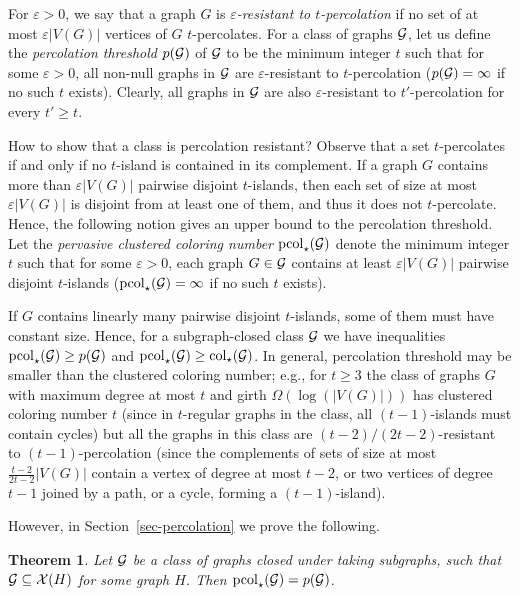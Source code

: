 \documentclass[12pt]{article}
\newcommand{\GG}{{\cal G}}
\newtheorem{theorem}{Theorem}
\newcommand{\col}{\text{col}}
\newcommand{\mc}[1]{\mathcal{#1}}
\begin{document}
For $\varepsilon>0$, we say that a graph $G$ is \emph{$\varepsilon$-resistant to $t$-percolation} if no set of at most $\varepsilon|V(G)|$ vertices of $G$ $t$-percolates.
For a class of graphs $\GG$, let us define the \emph{percolation threshold $p(\GG)$}
of $\GG$ to be the minimum integer $t$ such that for some $\varepsilon>0$, all non-null graphs in $\GG$
are $\varepsilon$-resistant to $t$-percolation ($p(\GG)=\infty$ if no such $t$ exists).  Clearly, all graphs in $\GG$ are also $\varepsilon$-resistant to $t'$-percolation for every $t'\ge t$.

How to show that a class is percolation resistant?  Observe that a set $t$-percolates if and only if no $t$-island is contained in its complement.  If a graph $G$ contains more than $\varepsilon |V(G)|$
pairwise disjoint $t$-islands, then each set of size at most $\varepsilon|V(G)|$ is disjoint from at least one of them, and thus it does not $t$-percolate.  Hence, the following notion gives an upper bound to
the percolation threshold.  Let the \emph{pervasive clustered coloring number $\text{pcol}_\star(\GG)$} denote the minimum integer $t$ such that for some $\varepsilon>0$, each graph $G\in\GG$ contains at least $\varepsilon |V(G)|$ pairwise disjoint $t$-islands
($\text{pcol}_\star(\GG)=\infty$ if no such $t$ exists).

If $G$ contains linearly many pairwise disjoint $t$-islands, some of them must have constant size.  Hence, for a subgraph-closed class $\GG$ we have inequalities $\text{pcol}_\star(\GG)\ge p(\GG)$ and $\text{pcol}_\star(\GG)\ge \col_\star(\GG)$.
In general, percolation threshold may be smaller than the clustered coloring number; e.g., for $t\ge 3$ the class of graphs $G$ with maximum degree at most $t$ and girth $\Omega(\log(|V(G)|))$
has clustered coloring number $t$ (since in $t$-regular graphs in the class, all $(t-1)$-islands must contain cycles) but all the graphs in this class are $(t-2)/(2t-2)$-resistant to $(t-1)$-percolation
(since the complements of sets of size at most $\tfrac{t-2}{2t-2}|V(G)|$ contain a vertex of degree at most $t-2$, or two vertices of degree $t-1$ joined by a path, or a cycle, forming a $(t-1)$-island).

However, in Section~\ref{sec-percolation} we prove the following.
 
\begin{theorem}\label{thm-percol1}
	Let $\GG$ be a class of graphs closed under taking subgraphs, such that  $\GG \subseteq \mc{X}(H)$ for some graph $H$.  Then $\text{pcol}_\star(\GG)= p(\GG)$.
\end{theorem}
 
\end{document}
